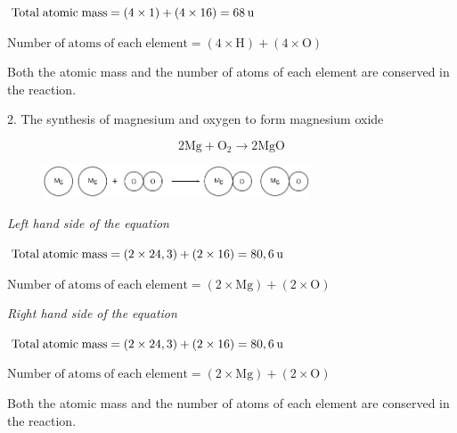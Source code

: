      \par 
      \label{m38711*id64630}$\mathrm{Total\; atomic\; mass}=\left(4\ensuremath{\times}1\right)+\left(4\ensuremath{\times}16\right)=68\phantom{\rule{2pt}{0ex}}\mathrm{u}$\par 
      \label{m38711*id64660}$\mathrm{Number\; of\; atoms\; of\; each\; element}=\left(4\ensuremath{\times}\mathrm{H}\right)+\left(4\ensuremath{\times}\mathrm{O}\right)$\par 
      \label{m38711*id64682}Both the atomic mass and the number of atoms of each element are conserved in the reaction.\par 
      \label{m38711*id64686}2. The synthesis of magnesium and oxygen to form magnesium oxide\par 
      \label{m38711*eip-233}\nopagebreak\noindent{}
    \begin{equation}
    2\mathrm{Mg}+{\mathrm{O}}_{2}\to 
            2\mathrm{MgO}\tag{12.7}
      \end{equation}
    \label{m38711*id64723}
    \setcounter{subfigure}{0}
	\begin{figure}[H] %
    \begin{center}
    \label{m38711*id64726!!!underscore!!!media}\label{m38711*id64726!!!underscore!!!printimage}\includegraphics[width=300px]{col11305.imgs/m38711_CG10C4_008.png} %
      \vspace{2pt}
    \vspace{.1in}
    \end{center}
 \end{figure}       
      \par 
      \label{m38711*id64732}
        \textsl{Left hand side of the equation}
      \par 
      \label{m38711*id64739}$\mathrm{Total\; atomic\; mass}=\left(2\ensuremath{\times}24,3\right)+\left(2\ensuremath{\times}16\right)=80,6\phantom{\rule{2pt}{0ex}}\mathrm{u}$\par 
      \label{m38711*id64761}$\mathrm{Number\; of\; atoms\; of\; each\; element}=\left(2\ensuremath{\times}\mathrm{Mg}\right)+\left(2\ensuremath{\times}\mathrm{O}\right)$\par 
      \label{m38711*id64783}
        \textsl{Right hand side of the equation}
      \par 
      \label{m38711*id64790}$\mathrm{Total\; atomic\; mass}=\left(2\ensuremath{\times}24,3\right)+\left(2\ensuremath{\times}16\right)=80,6\phantom{\rule{2pt}{0ex}}\mathrm{u}$\par 
      \label{m38711*id64811}$\mathrm{Number\; of\; atoms\; of\; each\; element}=\left(2\ensuremath{\times}\mathrm{Mg}\right)+\left(2\ensuremath{\times}\mathrm{O}\right)$\par 
      \label{m38711*id64833}Both the atomic mass and the number of atoms of each element are conserved in the reaction.\par 
\label{m38711*secfhsst!!!underscore!!!id486}
